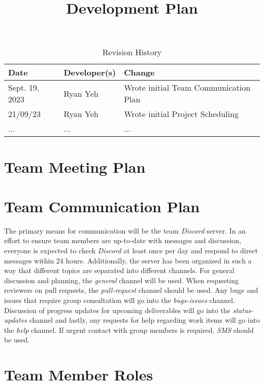 \documentclass{article}
\title{Development Plan\\\progname}
\author{\authname}
\date{}
\begin{document}
\maketitle

\begin{table}[hp]
\caption{Revision History} \label{TblRevisionHistory}
\begin{tabularx}{\textwidth}{llX}
\toprule
\textbf{Date} & \textbf{Developer(s)} & \textbf{Change}\\
\midrule
Sept. 19, 2023 & Ryan Yeh & Wrote initial Team Communication Plan\\
21/09/23 & Ryan Yeh & Wrote initial Project Scheduling\\
... & ... & ...\\
\bottomrule
\end{tabularx}
\end{table}


\section{Team Meeting Plan}

\section{Team Communication Plan}

The primary means for communication will be the team \emph{Discord} server. In an effort to 
ensure team members are up-to-date with messages and discussion, everyone is expected to check \emph{Discord}
at least once per day and respond to direct messages within 24 hours.
Additionally, the server has been organized in such a way that different topics are separated into different channels. 
For general  discussion and planning, the \emph{general} channel will be used. When requesting reviewers on pull requests, 
the \emph{pull-request} channel should be used. Any bugs and issues that require group consultation will go 
into the \emph{bugs-issues} channel. Discussion of progress updates for upcoming deliverables will go into the
\emph{status-updates} channel and lastly, any requests for help regarding work items will go into the \emph{help} channel.
If urgent contact with group members is required, \emph{SMS} should be used.

\section{Team Member Roles}
\end{document}
